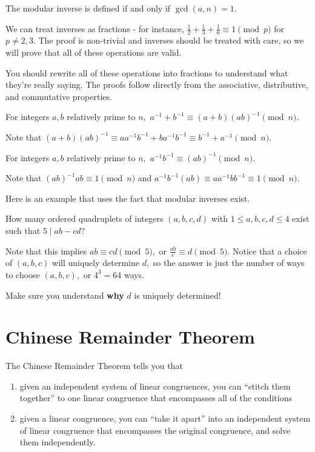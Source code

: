 \documentclass[blue,onecol]{shooting}
\begin{document}
The modular inverse is defined if and only if $\gcd(a,n)=1.$

We can treat inverses as fractions - for instance, $\frac{1}{2}+\frac{1}{3}+\frac{1}{6}\equiv 1\pmod{p}$ for $p\neq 2,3.$ The proof is non-trivial and inverses should be treated with care, so we will prove that all of these operations are valid.

You should rewrite all of these operations into fractions to understand what they're really saying. The proofs follow directly from the associative, distributive, and commutative properties.

\begin{fact}
For integers $a,b$ relatively prime to $n,$ $a^{-1}+b^{-1}\equiv (a+b)(ab)^{-1}\pmod{n}.$
\end{fact}

\begin{pro}
Note that $(a+b)(ab)^{-1}\equiv aa^{-1}b^{-1}+ba^{-1}b^{-1}\equiv b^{-1}+a^{-1}\pmod{n}.$
\end{pro}

\begin{fact}
For integers $a,b$ relatively prime to $n,$ $a^{-1}b^{-1}\equiv(ab)^{-1}\pmod{n}.$
\end{fact}

\begin{pro}
Note that $(ab)^{-1}ab\equiv 1\pmod{n}$ and $a^{-1}b^{-1}(ab)\equiv aa^{-1}bb^{-1}\equiv 1\pmod{n}.$
\end{pro}

Here is an example that uses the fact that modular inverses exist.

\begin{exam}
How many ordered quadruplets of integers $(a,b,c,d)$ with $1\leq a,b,c,d\leq 4$ exist such that $5\mid ab-cd$?
\end{exam}

\begin{sol}
Note that this implies $ab\equiv cd\pmod{5},$ or $\frac{ab}{c}\equiv d\pmod{5}.$ Notice that a choice of $(a,b,c)$ will uniquely determine $d,$ so the answer is just the number of ways to choose $(a,b,c),$ or $4^3=64$ ways.
\end{sol}

Make sure you understand \textbf{why} $d$ is uniquely determined!

\section{Chinese Remainder Theorem}
The Chinese Remainder Theorem tells you that
\begin{enumerate}
\item given an independent system of linear congruences, you can ``stitch them together'' to one linear congruence that encompasses all of the conditions
\item given a linear congruence, you can ``take it apart'' into an independent system of linear congruence that encompasses the original congruence, and solve them independently.
\end{enumerate}
\end{document}
